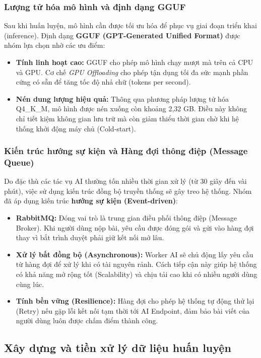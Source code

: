 \subsubsection{Lượng tử hóa mô hình và định dạng GGUF}
Sau khi huấn luyện, mô hình cần được tối ưu hóa để phục vụ giai đoạn triển khai (inference). Định dạng \textbf{GGUF (GPT-Generated Unified Format)} được nhóm lựa chọn nhờ các ưu điểm:
\begin{itemize}
    \item \textbf{Tính linh hoạt cao:} GGUF cho phép mô hình chạy mượt mà trên cả CPU và GPU. Cơ chế \textit{GPU Offloading} cho phép tận dụng tối đa sức mạnh phần cứng có sẵn để tăng tốc độ nhả chữ (tokens per second).
    \item \textbf{Nén dung lượng hiệu quả:} Thông qua phương pháp lượng tử hóa Q4\_K\_M, mô hình được nén xuống còn khoảng 2,32 GB. Điều này không chỉ tiết kiệm không gian lưu trữ mà còn giảm thiểu thời gian chờ khi hệ thống khởi động máy chủ (Cold-start).
\end{itemize}

\subsubsection{Kiến trúc hướng sự kiện và Hàng đợi thông điệp (Message Queue)}
Do đặc thù các tác vụ AI thường tốn nhiều thời gian xử lý (từ 30 giây đến vài phút), việc sử dụng kiến trúc đồng bộ truyền thống sẽ gây treo hệ thống. Nhóm đã áp dụng kiến trúc \textbf{hướng sự kiện (Event-driven)}:

\begin{itemize}
    \item \textbf{RabbitMQ:} Đóng vai trò là trung gian điều phối thông điệp (Message Broker). Khi người dùng nộp bài, yêu cầu được đóng gói và gửi vào hàng đợi thay vì bắt trình duyệt phải giữ kết nối mở lâu.
    \item \textbf{Xử lý bất đồng bộ (Asynchronous):} Worker AI sẽ chủ động lấy yêu cầu từ hàng đợi để xử lý khi có tài nguyên rảnh. Cách tiếp cận này giúp hệ thống có khả năng mở rộng tốt (Scalability) và chịu tải cao khi có nhiều người dùng cùng lúc.
    \item \textbf{Tính bền vững (Resilience):} Hàng đợi cho phép hệ thống tự động thử lại (Retry) nếu gặp lỗi kết nối tạm thời tới AI Endpoint, đảm bảo bài viết của người dùng luôn được chấm điểm thành công.
\end{itemize}

\subsection{Xây dựng và tiền xử lý dữ liệu huấn luyện}

